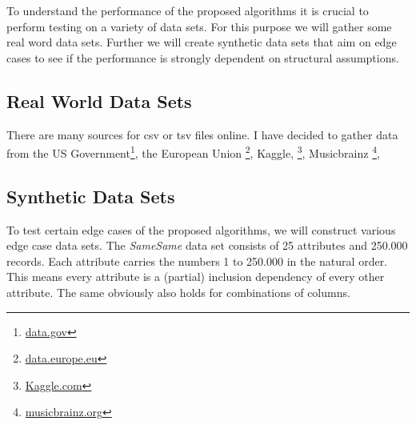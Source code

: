 To understand the performance of the proposed algorithms it is crucial to perform testing on a variety of data sets. For this purpose we will gather some real word data sets. Further we will create synthetic data sets that aim on edge cases to see if the performance is strongly dependent on structural assumptions.

\subsection{Real World Data Sets}
There are many sources for csv or tsv files online. I have decided to gather data from the US Government\footnote{\href{https://data.gov}{data.gov}}, the European Union \footnote{\href{https://data.europe.eu}{data.europe.eu}}, Kaggle, \footnote{\href{https://kaggle.com}{Kaggle.com}}, Musicbrainz \footnote{\href{https://musicbrainz.org/}{musicbrainz.org}}, 


\subsection{Synthetic Data Sets}
To test certain edge cases of the proposed algorithms, we will construct various edge case data sets. The \textit{SameSame} data set consists of 25 attributes and 250.000 records. Each attribute carries the numbers 1 to 250.000 in the natural order. This means every attribute is a (partial) inclusion dependency of every other attribute. The same obviously also holds for combinations of columns.


